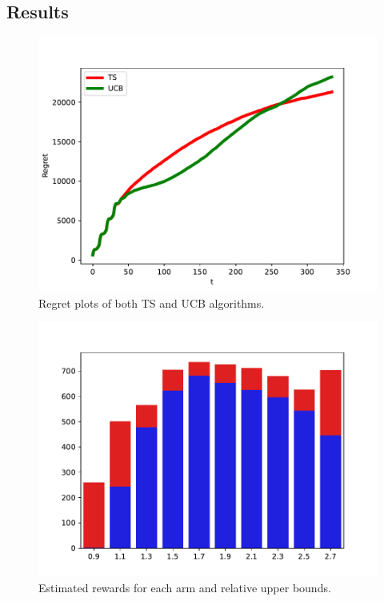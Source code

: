 \documentclass[12pt,a4paper]{report}
\begin{document}
			\subsection{Results}

\begin{figure}[H]
\centering
  \includegraphics[scale = 0.8, center]{3r}
  \caption{Regret plots of both TS and UCB algorithms.}
\end{figure}
\begin{figure}[H]
\centering
  \includegraphics[scale = 0.8, center]{3ucb}
  \caption{Estimated rewards for each arm and relative upper bounds.}
\end{figure}
\end{document}
